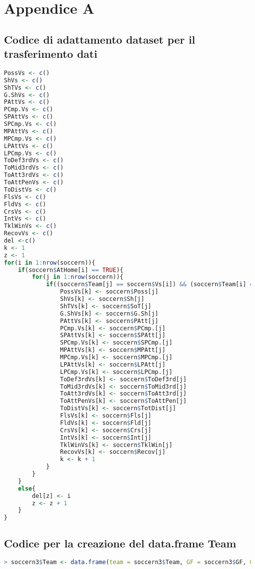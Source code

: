 \chapter{Appendice A}

\section{Codice di adattamento dataset per il trasferimento dati} \label{sec:a1}
\begin{lstlisting}[language=R]
PossVs <- c()
ShVs <- c()
ShTVs <- c()
G.ShVs <- c()
PAttVs <- c()
PCmp.Vs <- c()
SPAttVs <- c()
SPCmp.Vs <- c()
MPAttVs <- c()
MPCmp.Vs <- c()
LPAttVs <- c()
LPCmp.Vs <- c()
ToDef3rdVs <- c()
ToMid3rdVs <- c()
ToAtt3rdVs <- c()
ToAttPenVs <- c()
ToDistVs <- c()
FlsVs <- c()
FldVs <- c()
CrsVs <- c()
IntVs <- c()
TklWinVs <- c()
RecovVs <- c()
del <-c()
k <- 1
z <- 1
for(i in 1:nrow(soccern)){
	if(soccern$AtHome[i] == TRUE){
		for(j in 1:nrow(soccern)){
			if((soccern$Team[j] == soccern$Vs[i]) && (soccern$Team[i] == soccern$Vs[j]) && (soccern$AtHome[j] == FALSE)){
				PossVs[k] <- soccern$Poss[j]
				ShVs[k] <- soccern$Sh[j]
				ShTVs[k] <- soccern$SoT[j]
				G.ShVs[k] <- soccern$G.Sh[j]
				PAttVs[k] <- soccern$PAtt[j]
				PCmp.Vs[k] <- soccern$PCmp.[j]
				SPAttVs[k] <- soccern$SPAtt[j]
				SPCmp.Vs[k] <- soccern$SPCmp.[j]
				MPAttVs[k] <- soccern$MPAtt[j]
				MPCmp.Vs[k] <- soccern$MPCmp.[j]
				LPAttVs[k] <- soccern$LPAtt[j]
				LPCmp.Vs[k] <- soccern$LPCmp.[j]
				ToDef3rdVs[k] <- soccern$ToDef3rd[j]
				ToMid3rdVs[k] <- soccern$ToMid3rd[j]
				ToAtt3rdVs[k] <- soccern$ToAtt3rd[j]
				ToAttPenVs[k] <- soccern$ToAttPen[j]
				ToDistVs[k] <- soccern$TotDist[j]
				FlsVs[k] <- soccern$Fls[j]
				FldVs[k] <- soccern$Fld[j]
				CrsVs[k] <- soccern$Crs[j]
				IntVs[k] <- soccern$Int[j]
				TklWinVs[k] <- soccern$TklWin[j]
				RecovVs[k] <- soccern$Recov[j]
				k <- k + 1
			}      
		}
	}
	else{
		del[z] <- i
		z <- z + 1
	}
}
\end{lstlisting}
\bigskip
\section{Codice per la creazione del data.frame Team} \label{sec:a2}
\begin{lstlisting}[language=R]
	> soccern3$Team <- data.frame(team = soccern3$Team, GF = soccern3$GF, GA = soccern3$GA,  at.home = 1, Poss = soccern3$Poss, Sh = soccern3$Sh, SoT = soccern3$SoT, G.Sh = soccern3$G.Sh, PAtt = soccern3$PAtt, PCmp. = soccern3$PCmp., SPAtt = soccern3$SPAtt, SPCmp. = soccern3$SPCmp., MPAtt = soccern3$MPAtt, MPCmp. = soccern3$MPCmp., LPAtt = soccern3$LPAtt, LPCmp. = soccern3$LPCmp., ToDef3rd = soccern3$ToDef3rd, ToAtt3rd = soccern3$ToAtt3rd, ToAttPen = soccern3$ToAttPen, TotDist = soccern3$TotDist, Fls = soccern3$Fls, Fld = soccern3$Fld, Crs = soccern3$Crs, Int = soccern3$Int, TklWin = soccern3$TklWin, Recov = soccern3$Recov)
\end{lstlisting}
\bigskip
